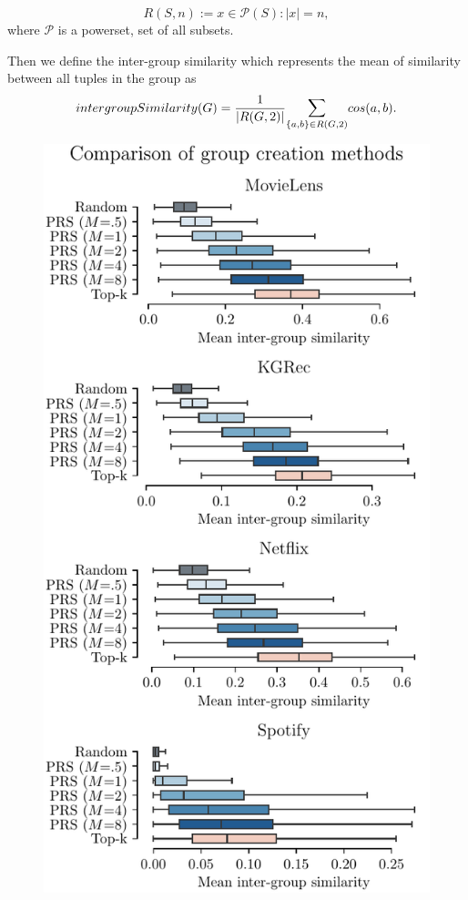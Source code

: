 \begin{equation}
    R(S, n) := { x \in \mathcal{P}(S) : |x| = n},
    \end{equation}
where $\mathcal{P}$ is a powerset, set of all subsets. 

Then we define the inter-group similarity which represents the mean of similarity between all tuples in the group as
\begin{equation}
    intergroupSimilarity(G) = \frac{1}{|R(G,2)|}\mathlarger{\sum}_{\{a,b\} \in R(G,2)}  cos(a,b).
\end{equation}


\begin{figure}[ht!]
    \centering
    \includegraphics{img/figures/inter_group_means.pdf}

\end{figure}
